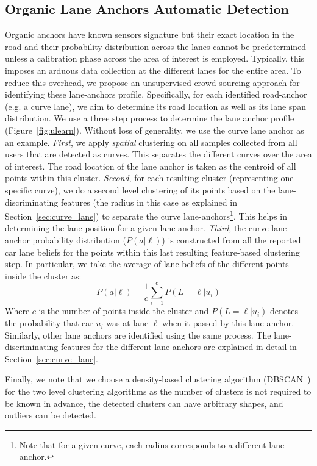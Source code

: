 \documentclass[10pt, conference, compsocconf]{IEEEtran}
\begin{document}
\subsection{Organic Lane Anchors Automatic Detection}\label{sec:organic_update}
Organic anchors have known sensors signature but
their exact location in the road and their probability distribution across
the lanes cannot be predetermined unless a calibration phase across the area of interest is employed. Typically, this imposes an arduous data collection at the different lanes for the entire area.  To reduce this overhead, we propose an unsupervised crowd-sourcing approach for identifying these lane-anchors profile. Specifically, for each identified road-anchor (e.g. a curve lane), we aim to determine its road location as well as its lane span distribution. 
We use a three step process to determine the lane anchor profile (Figure~\ref{fig:ulearn}). Without loss of generality, we use the curve lane anchor as an example. \emph{First}, we apply \emph{spatial} clustering on all samples collected from all users that are detected as curves. This separates the different curves over the area of interest. The road location of the lane anchor is taken as the centroid of all points within this cluster. \emph{Second}, for each resulting cluster (representing one specific curve), we do a second level clustering of its points based on the lane-discriminating features (the radius in this case as explained in Section~\ref{sec:curve_lane}) to separate the curve lane-anchors\footnote{Note that for a given curve, each radius corresponds to a different lane anchor.}. This helps in determining the lane position for a given lane anchor. \emph{Third}, the curve lane anchor probability distribution ($P(a|\ell)$) is constructed from all the reported car lane beliefs for the points within this last resulting feature-based clustering step. In particular, we take the average of lane beliefs of the different points inside the cluster as:
\begin{equation}
P(a|\ell) = \frac{1}{c}\sum_{i=1}^{c} P(L=\ell|u_i)
\label{eq:aggr}
\end{equation}
Where $c$ is the number of points inside the cluster and $P(L=\ell|u_i)$ denotes the probability that car $u_i$ was at lane $\ell$ when it passed by this lane anchor. Similarly, other lane anchors are identified using the same process. The lane-discriminating features for the different lane-anchors are explained in detail in Section~\ref{sec:curve_lane}.

Finally, we note that we choose a density-based clustering algorithm (DBSCAN~\cite{ester1996density}) for the two level clustering algorithms as the number of clusters is not required to be known in advance, the detected clusters can have arbitrary shapes, and outliers can be detected. 
\end{document}
